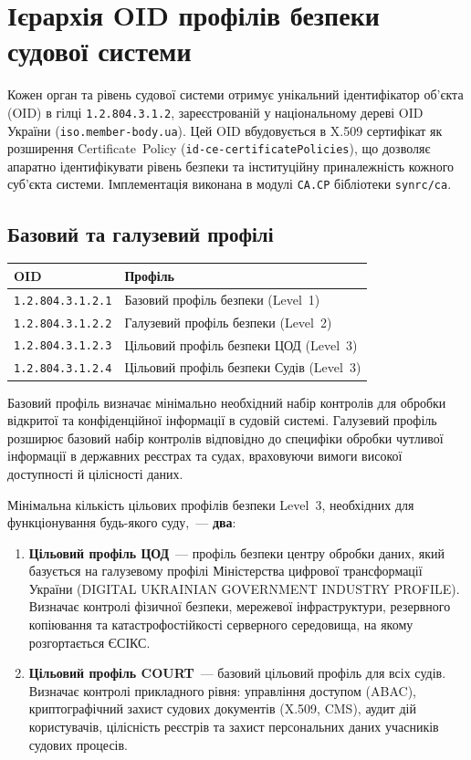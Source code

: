 \newpage
\section{Ієрархія OID профілів безпеки судової системи}

Кожен орган та рівень судової системи отримує унікальний ідентифікатор об'єкта
(OID) в гілці \texttt{1.2.804.3.1.2}, зареєстрованій у національному дереві OID
України (\texttt{iso.member-body.ua}). Цей OID вбудовується в X.509 сертифікат як
розширення Certificate~Policy (\texttt{id-ce-certificatePolicies}), що дозволяє
апаратно ідентифікувати рівень безпеки та інституційну приналежність кожного
суб'єкта системи. Імплементація виконана в модулі \texttt{CA.CP} бібліотеки
\texttt{synrc/ca}.

\subsection{Базовий та галузевий профілі}

\begin{tabular}{ll}
\textbf{OID}                 & \textbf{Профіль} \\
\hline
\texttt{1.2.804.3.1.2.1}     & Базовий профіль безпеки (Level~1) \\
\texttt{1.2.804.3.1.2.2}     & Галузевий профіль безпеки (Level~2) \\
\texttt{1.2.804.3.1.2.3}     & Цільовий профіль безпеки ЦОД (Level~3) \\
\texttt{1.2.804.3.1.2.4}     & Цільовий профіль безпеки Судів (Level~3) \\
\end{tabular}

\vspace{0.5em}
Базовий профіль визначає мінімально необхідний набір контролів для обробки відкритої
та конфіденційної інформації в судовій системі. Галузевий профіль розширює базовий
набір контролів відповідно до специфіки обробки чутливої інформації в державних
реєстрах та судах, враховуючи вимоги високої доступності й цілісності даних.

Мінімальна кількість цільових профілів безпеки Level~3, необхідних для функціонування
будь-якого суду,~--- \textbf{два}:

\begin{enumerate}
    \item \textbf{Цільовий профіль ЦОД}~--- профіль безпеки центру обробки даних,
          який базується на галузевому профілі Міністерства цифрової трансформації
          України (DIGITAL UKRAINIAN GOVERNMENT INDUSTRY PROFILE). Визначає контролі
          фізичної безпеки, мережевої інфраструктури, резервного копіювання та
          катастрофостійкості серверного середовища, на якому розгортається ЄСІКС.
    \item \textbf{Цільовий профіль COURT}~--- базовий цільовий профіль для всіх
          судів. Визначає контролі прикладного рівня: управління доступом (ABAC),
          криптографічний захист судових документів (X.509, CMS), аудит дій
          користувачів, цілісність реєстрів та захист персональних даних учасників
          судових процесів.
\end{enumerate}

